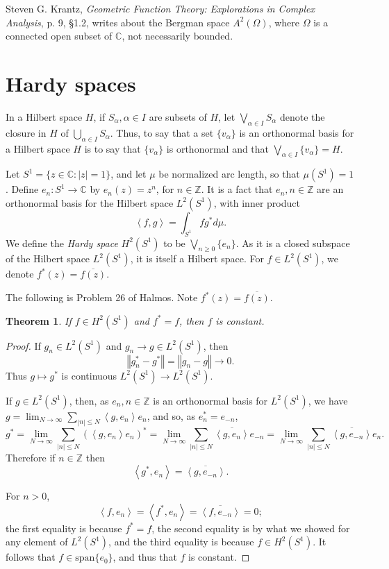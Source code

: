\documentclass{article}
\newcommand{\inner}[2]{\left\langle #1, #2 \right\rangle}
\newcommand{\Span}{\textrm{span}}
\newcommand{\norm}[1]{\left\Vert #1 \right\Vert}
\newtheorem{theorem}{Theorem}
\begin{document}
Steven G. Krantz, {\em Geometric Function Theory: Explorations in Complex Analysis},
p. 9, \S 1.2, writes about the Bergman space $A^2(\Omega)$, where $\Omega$ is a connected
open subset of $\mathbb{C}$, not necessarily bounded.





\section{Hardy spaces}
In a Hilbert  space $H$, if $S_\alpha, \alpha \in I$ are subsets of $H$, let $\bigvee_{\alpha \in I} S_\alpha$ denote the closure in $H$ of
$\bigcup_{\alpha \in I} S_\alpha$. Thus, to say that a set $\{v_\alpha\}$ is an orthonormal basis for a Hilbert space $H$ is to say that $\{v_\alpha\}$ is orthonormal
and that $\bigvee_{\alpha \in I} \{v_\alpha\}=H$.

Let $S^1=\{z \in \mathbb{C}: |z|=1\}$, and let $\mu$ be normalized arc length, so that $\mu(S^1)=1$. Define $e_n:S^1 \to \mathbb{C}$ by $e_n(z)=z^n$, for
$n \in \mathbb{Z}$. 
It is a fact that $e_n, n \in \mathbb{Z}$ are an orthonormal basis for the Hilbert space
$L^2(S^1)$, with inner product
\[
\inner{f}{g}=\int_{S^1} f g^* d\mu.
\]
We define the {\em Hardy space} $H^2(S^1)$ to be $\bigvee_{n \geq 0} \{e_n\}$.
As it is a closed subspace of the Hilbert space $L^2(S^1)$, it is itself a Hilbert space. 
For $f \in L^2(S^1)$, we denote $f^*(z)=\overline{f(z)}$.

The following is Problem 26 of Halmos. Note $f^*(z)=\overline{f(z)}$.

\begin{theorem}
If $f \in H^2(S^1)$ and $f^*=f$, then $f$ is constant.
\end{theorem}
\begin{proof}
If $g_n \in L^2(S^1)$ and $g_n \to g \in L^2(S^1)$, then
\[
\norm{g_n^*-g^*}=\norm{g_n-g} \to 0.
\]
Thus $g \mapsto g^*$ is continuous $L^2(S^1) \to L^2(S^1)$.

If $g \in L^2(S^1)$, then, as $e_n, n \in \mathbb{Z}$ is an orthonormal basis for $L^2(S^1)$, we have
 $g=\lim_{N \to \infty} \sum_{|n| \leq N} \inner{g}{e_n} e_n$, and so, as $e_n^*=e_{-n}$,
\[
g^* = \lim_{N \to \infty} \sum_{|n| \leq N} (\inner{g}{e_n} e_n)^* = \lim_{N \to \infty} \sum_{|n| \leq N} \overline{\inner{g}{e_n}} e_{-n} 
= \lim_{N \to \infty} \sum_{|n| \leq N} \overline{\inner{g}{e_{-n}}} e_n.
\]
Therefore if $n \in \mathbb{Z}$ then
\begin{equation}
\inner{g^*}{e_n}=\overline{\inner{g}{e_{-n}}}.
\label{gstar}
\end{equation}

For
$n>0$,
\[
\inner{f}{e_n}=\inner{f^*}{e_n}=\overline{\inner{f}{e_{-n}}}=0;
\]
the first equality is because $f^*=f$, the second equality is by what we showed for any element of $L^2(S^1)$, and the third equality
is because $f \in H^2(S^1)$. It follows that $f \in \Span\{e_0\}$, and thus that $f$ is constant.
\end{proof}
\end{document}
